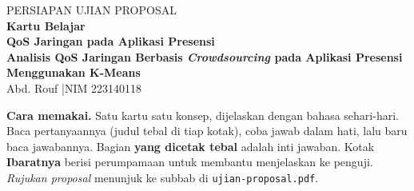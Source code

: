 \documentclass[11pt,a4paper]{article}
\begin{document}
\thispagestyle{plain}
\begin{center}
{\small\color{accent}\ttfamily PERSIAPAN UJIAN PROPOSAL}\\[6pt]
{\huge\bfseries\color{head} Kartu Belajar}\\[4pt]
{\Large\bfseries QoS Jaringan pada Aplikasi Presensi}\\[8pt]
{\bfseries Analisis QoS Jaringan Berbasis \textit{Crowdsourcing} pada Aplikasi Presensi Menggunakan K-Means}\\[6pt]
Abd. Rouf \quad|\quad NIM 223140118
\end{center}
\vspace{10pt}

\begin{tcolorbox}[enhanced, colback=accentsoft, frame hidden, arc=3pt, left=10pt, right=10pt]
\textbf{Cara memakai.} Satu kartu satu konsep, dijelaskan dengan bahasa sehari-hari.
Baca pertanyaannya (judul tebal di tiap kotak), coba jawab dalam hati, lalu baru baca jawabannya.
Bagian \textbf{yang dicetak tebal} adalah inti jawaban. Kotak \textcolor{warm}{\textbf{Ibaratnya}}
berisi perumpamaan untuk membantu menjelaskan ke penguji. \emph{Rujukan proposal} menunjuk ke
subbab di \texttt{ujian-proposal.pdf}.
\end{tcolorbox}

\vspace{6pt}
\tableofcontents
\end{document}
